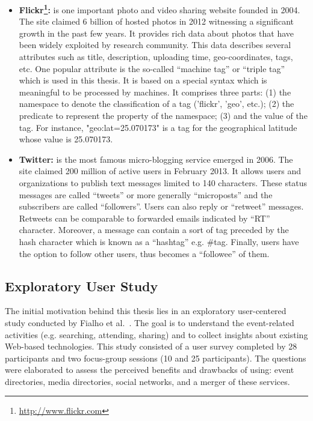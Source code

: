 \begin{itemize}
\item \textbf{Flickr\footnote{\url{http://www.flickr.com}}:} is one important photo and video sharing website founded in 2004. The site claimed 6 billion of hosted photos in 2012 witnessing a significant growth in the past few years. It provides rich data about photos that have been widely exploited by research community. This data describes several attributes such as title, description, uploading time, geo-coordinates, tags, etc. One popular attribute is the so-called ``machine tag'' or ``triple tag'' which is used in this thesis. It is based on a special syntax which is meaningful to be processed by machines. It comprises three parts: (1) the namespace to denote the classification of a tag ('flickr', 'geo', etc.); (2) the predicate to represent the property of the namespace; (3) and the value of the tag. For instance, "geo:lat=25.070173" is a tag for the geographical latitude whose value is 25.070173.

\item \textbf{Twitter:} is the most famous micro-blogging service emerged in 2006. The site claimed 200 million of active users in February 2013. It allows users and organizations to publish text messages limited to 140 characters. These status messages are called ``tweets'' or more generally ``microposts'' and the subscribers are called ``followers''. Users can also reply or ``retweet'' messages. Retweets can be comparable to forwarded emails indicated by ``RT'' character. Moreover, a message can contain a sort of tag preceded by the hash character which is known as a ``hashtag'' e.g. \#tag. Finally, users have the option to follow other users, thus becomes a ``followee'' of them.

\end{itemize}

\subsection{Exploratory User Study}
The initial motivation behind this thesis lies in an exploratory user-centered study conducted by Fialho et al.~\cite{Fialho:EVENTS10}. The goal is to understand the event-related activities (e.g. searching, attending, sharing) and to collect insights about existing Web-based technologies. This study consisted of a user survey completed by 28 participants and two focus-group sessions (10 and 25 participants). The questions were elaborated to assess the perceived benefits and drawbacks of using: event directories, media directories, social networks, and a merger of these services.


